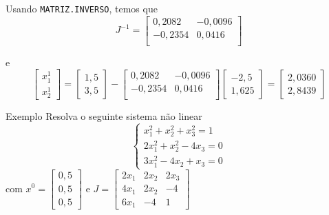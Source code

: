 \begin{frame}[c]
    Usando \texttt{MATRIZ.INVERSO}, temos que
    \[
        J^{-1}=
        \begin{bmatrix}
            0,2082 &	-0,0096 \\
            -0,2354	& 0,0416  \\
        \end{bmatrix}
    \]

    e
    \[
        \begin{bmatrix}
            x_1^1 \\ x_2^1
        \end{bmatrix}
        =
        \begin{bmatrix}
            1,5 \\ 3,5
        \end{bmatrix}
        -
        \begin{bmatrix}
            0,2082 &	-0,0096 \\
            -0,2354	& 0,0416  \\
        \end{bmatrix}
        \begin{bmatrix}
            -2,5 \\
            1,625
        \end{bmatrix}
        =
        \begin{bmatrix}
            2,0360 \\
            2,8439
        \end{bmatrix}
    \]
\end{frame}

\begin{frame}{Exemplo}
    Resolva o seguinte sistema não linear
    \[
        \begin{cases}
            x_1^2+x_2^2+x_3^2=1 \\
            2x_1^2+x_2^2-4x_3=0 \\
            3x_1^2-4x_2+x_3=0
        \end{cases}
    \]
    com
    \(
    x^0=
    \begin{bmatrix}
        0,5 \\ 0,5 \\ 0,5
    \end{bmatrix}
    \)
    e
    \(
    J=
    \begin{bmatrix}
        2x_1 & 2x_2 & 2x_3 \\
        4x_1 & 2x_2 & -4 \\
        6x_1 & -4 & 1
    \end{bmatrix}
    \)
\end{frame}

